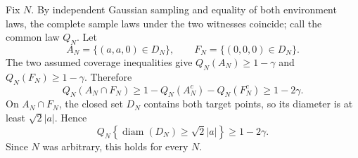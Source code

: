 Fix \(N\).  By independent Gaussian sampling and equality of both environment laws, the complete sample laws under the two witnesses coincide; call the common law \(Q_N\).  Let
\[
 A_N=\{(a,a,0)\in D_N\},\qquad
 F_N=\{(0,0,0)\in D_N\}.
\]
The two assumed coverage inequalities give \(Q_N(A_N)\ge1-\gamma\) and \(Q_N(F_N)\ge1-\gamma\).  Therefore
\[
 Q_N(A_N\cap F_N)
 \ge1-Q_N(A_N^c)-Q_N(F_N^c)
 \ge1-2\gamma.
\]
On \(A_N\cap F_N\), the closed set \(D_N\) contains both target points, so its diameter is at least \(\sqrt2|a|\).  Hence
\[
 Q_N\!\left\{\operatorname{diam}(D_N)\ge\sqrt2|a|\right\}\ge1-2\gamma.
\]
Since \(N\) was arbitrary, this holds for every \(N\).